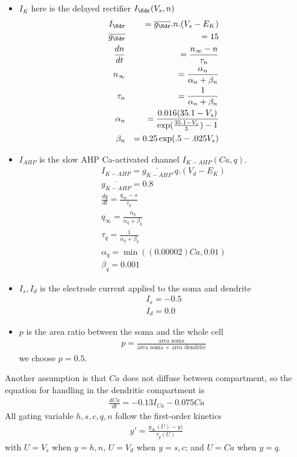 \begin{itemize}
\item $I_{K}$ here is the delayed rectifier $I_\Kdr(V_s,n)$
  \begin{eqnarray*}
    I_\Kdr &&= \overline{g_\Kdr}.n.(V_s-E_K) \\
    \overline{g_\Kdr} &&= 15\\
    \frac{dn}{dt} &&= \frac{n_\infty-n}{\tau_n}\\
    n_\infty &&= \frac{\alpha_n}{\alpha_n+\beta_n} \\
    \tau_n &&=  \frac{1}{\alpha_n+\beta_n} \\
    \alpha_n &&= \frac{0.016(35.1-V_s)}{\exp(\frac{35.1-V_s}{5}) - 1} \\
    \beta_n &&= 0.25\exp(.5-.025V_s)
  \end{eqnarray*}

\item $I_{AHP}$ is the slow AHP Ca-activated  channel
  $I_{K-AHP}(Ca,q)$.
  \begin{eqnarray*}
    I_{K-AHP} = \overline{g_{K-AHP}}. q .(V_d-E_K) \\
    \overline{g_{K-AHP}} = 0.8 \\
    \frac{dq}{dt} =  \frac{q_\infty-s}{\tau_q} \\
    q_\infty = \frac{\alpha_q}{\alpha_q+\beta_q} \\
    \tau_q =  \frac{1}{\alpha_q+\beta_q} \\ 
    \alpha_q = \min((0.00002)Ca,0.01)\\
    \beta_q = 0.001
  \end{eqnarray*}
\item $I_{s},I_{d}$ is the electrode current applied to the soma
  and dendrite
  \begin{eqnarray*}
    I_s = -0.5 \\
    I_d = 0.0
  \end{eqnarray*}
\item $p$ is the area ratio between the soma and the whole cell 
  \begin{eqnarray*}
    p = \frac{\text{area soma}}{\text{area soma + area dendrite}}
  \end{eqnarray*}
we choose $p=0.5$. 
\end{itemize}

Another assumption is that $Ca$ does not diffuse between compartment,
so the equation for  handling in the dendritic compartment
is
\begin{eqnarray}
  \label{eq:564}
  \frac{dCa}{dt}= -0.13 I_{Ca} - 0.075 Ca
\end{eqnarray}
All gating variable $h,s,c,q,n$ follow the first-order kinetics
\begin{eqnarray}
  \label{eq:565}
  y' = \frac{y_\infty(U)-y)}{\tau_y(U)}
\end{eqnarray}
with $U=V_s$ when $y=h,n$, $U=V_d$ when $y=s,c$; and $U=Ca$ when
$y=q$.


